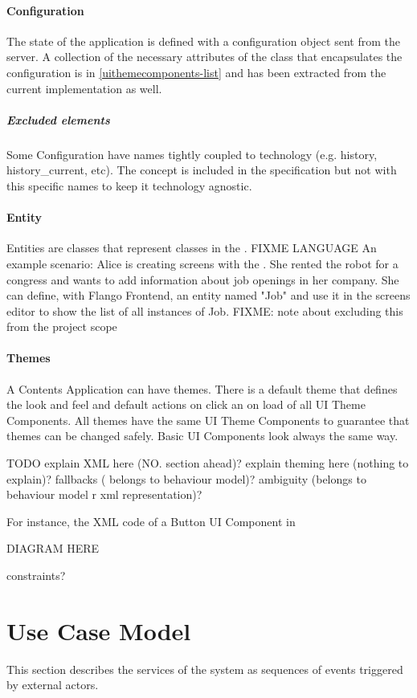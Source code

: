 \paragraph{Configuration} The state of the application is defined with a configuration object sent from the server.
A collection of the necessary attributes of the class that encapsulates the configuration is in \ref{uithemecomponents-list} and has been extracted from the current implementation as well.
\subparagraph{Excluded elements} Some Configuration have names tightly coupled to technology (e.g. history, history\_current, etc). 
The concept is included in the specification but not with this specific names to keep it technology agnostic.

\paragraph{Entity} Entities are classes that represent classes in the \se. 
FIXME LANGUAGE An example scenario: Alice is creating screens with the \se.
She rented the robot for a congress and wants to add information about job openings in her company.
She can define, with Flango Frontend, an entity named "Job" and use it in the screens editor to show the list of all instances of Job.
FIXME: note about excluding this from the project scope

\paragraph{Themes} A Contents Application can have themes.
There is a default theme that defines the look and feel and default actions on click an on load of all UI Theme Components.
All themes have the same UI Theme Components to guarantee that themes can be changed safely.
Basic UI Components look always the same way.

TODO explain XML here (NO. section ahead)? explain theming here (nothing to explain)? fallbacks ( belongs to behaviour model)? ambiguity (belongs to behaviour model r xml representation)?

For instance, the \ac{XML} code of a Button UI Component in 



DIAGRAM HERE

constraints?
\FloatBarrier

\section{Use Case Model}
This section describes the services of the system as sequences of events triggered by external actors.

